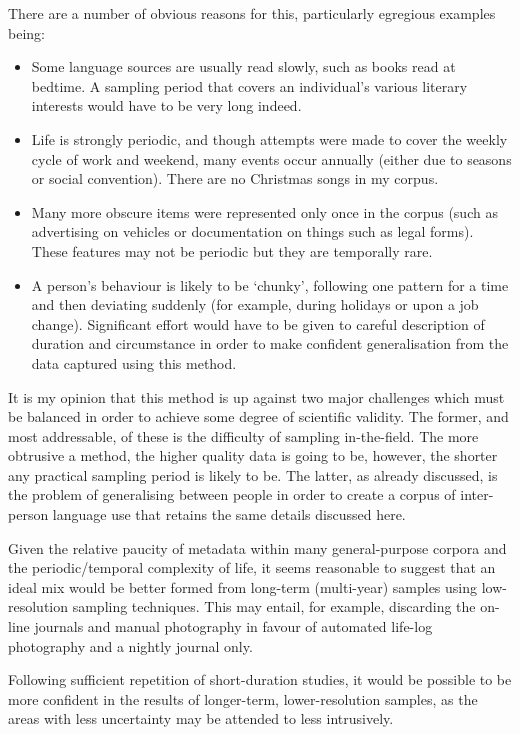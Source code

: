 There are a number of obvious reasons for this, particularly egregious examples being:

\begin{itemize}
    \item Some language sources are usually read slowly, such as books read at bedtime.  A sampling period that covers an individual's various literary interests would have to be very long indeed.
    \item Life is strongly periodic, and though attempts were made to cover the weekly cycle of work and weekend, many events occur annually (either due to seasons or social convention).  There are no Christmas songs in my corpus.
    \item Many more obscure items were represented only once in the corpus (such as advertising on vehicles or documentation on things such as legal forms).  These features may not be periodic but they are temporally rare.
    \item A person's behaviour is likely to be `chunky', following one pattern for a time and then deviating suddenly (for example, during holidays or upon a job change).  Significant effort would have to be given to careful description of duration and circumstance in order to make confident generalisation from the data captured using this method.
\end{itemize}

It is my opinion that this method is up against two major challenges which must be balanced in order to achieve some degree of scientific validity.  The former, and most addressable, of these is the difficulty of sampling in-the-field.  The more obtrusive a method, the higher quality data is going to be, however, the shorter any practical sampling period is likely to be.  The latter, as already discussed, is the problem of generalising between people in order to create a corpus of inter-person language use that retains the same details discussed here.

Given the relative paucity of metadata within many general-purpose corpora and the periodic/temporal complexity of life, it seems reasonable to suggest that an ideal mix would be better formed from long-term (multi-year) samples using low-resolution sampling techniques.  This may entail, for example, discarding the on-line journals and manual photography in favour of automated life-log photography and a nightly journal only.

Following sufficient repetition of short-duration studies, it would be possible to be more confident in the results of longer-term, lower-resolution samples, as the areas with less uncertainty may be attended to less intrusively.








